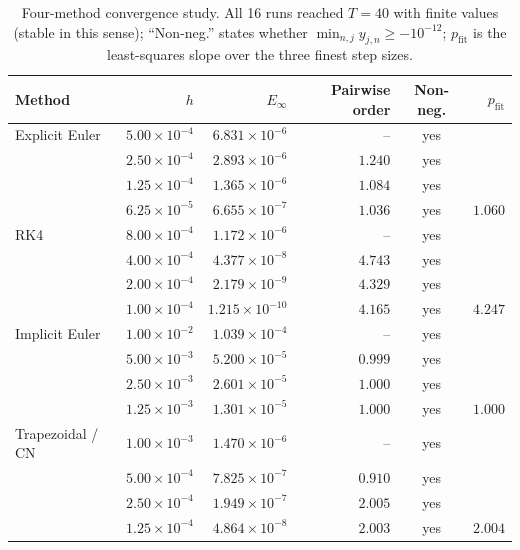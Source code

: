 \begin{table}[H]
\centering
\caption{Four-method convergence study. All 16 runs reached $T=40$ with finite values (stable in this sense); ``Non-neg.'' states whether $\min_{n,j}y_{j,n}\ge-10^{-12}$; $p_{\mathrm{fit}}$ is the least-squares slope over the three finest step sizes.}
\label{tab:convergence}
\small
\begin{tabular}{lrrrcr}
\toprule
Method & $h$ & $E_\infty$ & Pairwise order & Non-neg. & $p_{\mathrm{fit}}$\\
\midrule
Explicit Euler & $5.00\times10^{-4}$ & $6.831\times10^{-6}$ & -- & yes & \\
 & $2.50\times10^{-4}$ & $2.893\times10^{-6}$ & $1.240$ & yes & \\
 & $1.25\times10^{-4}$ & $1.365\times10^{-6}$ & $1.084$ & yes & \\
 & $6.25\times10^{-5}$ & $6.655\times10^{-7}$ & $1.036$ & yes & $1.060$\\
\addlinespace[0.25em]
RK4 & $8.00\times10^{-4}$ & $1.172\times10^{-6}$ & -- & yes & \\
 & $4.00\times10^{-4}$ & $4.377\times10^{-8}$ & $4.743$ & yes & \\
 & $2.00\times10^{-4}$ & $2.179\times10^{-9}$ & $4.329$ & yes & \\
 & $1.00\times10^{-4}$ & $1.215\times10^{-10}$ & $4.165$ & yes & $4.247$\\
\addlinespace[0.25em]
Implicit Euler & $1.00\times10^{-2}$ & $1.039\times10^{-4}$ & -- & yes & \\
 & $5.00\times10^{-3}$ & $5.200\times10^{-5}$ & $0.999$ & yes & \\
 & $2.50\times10^{-3}$ & $2.601\times10^{-5}$ & $1.000$ & yes & \\
 & $1.25\times10^{-3}$ & $1.301\times10^{-5}$ & $1.000$ & yes & $1.000$\\
\addlinespace[0.25em]
Trapezoidal / CN & $1.00\times10^{-3}$ & $1.470\times10^{-6}$ & -- & yes & \\
 & $5.00\times10^{-4}$ & $7.825\times10^{-7}$ & $0.910$ & yes & \\
 & $2.50\times10^{-4}$ & $1.949\times10^{-7}$ & $2.005$ & yes & \\
 & $1.25\times10^{-4}$ & $4.864\times10^{-8}$ & $2.003$ & yes & $2.004$\\
\bottomrule
\end{tabular}
\end{table}
